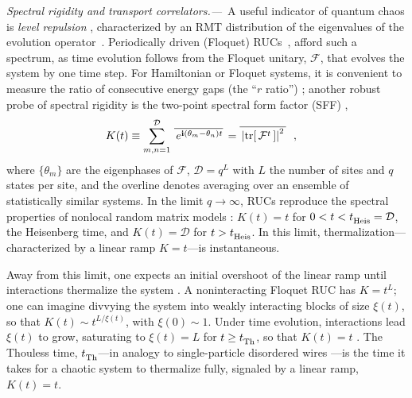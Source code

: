 \documentclass[prl,aps,amsfonts,twocolumn,superscriptaddress,notitlepage,floatfix]{revtex4-1}
\newcommand{\be}{\begin{eqnarray}}
\newcommand{\ee}{\end{eqnarray}}
\newcommand{\vpd}[0]{\vphantom{\dagger}}
\newcommand{\trace}{{\rm tr}}
\def\Floq{\mathcal{F}}
\def\tth{t^{\vpd}_{\rm Th}}
\def\theis{t^{\vpd}_{\rm Heis}}
\def\Hdim{\mathcal{D}}
\def\Ldim{q}
\begin{document}
\noindent \emph{Spectral rigidity and transport correlators.---}\, A useful indicator of quantum chaos is \emph{level repulsion} \cite{ETH1,ETH2,ShenkerRMT}, characterized by an RMT distribution of the eigenvalues of the evolution operator~\cite{ShenkerRMT,ShenkerRMT,ProsenRMTChaosPRX,SwingleSFFHydro,CDLC1,CDLC2,U1FRUC,Kos_2021}. Periodically driven (Floquet) RUCs~\cite{CDLC1,CDLC2,CiracRUFC,U1FRUC}, afford such a spectrum, as time evolution follows from the Floquet unitary, $\Floq$, that evolves the system by one time step. For Hamiltonian or Floquet systems, it is convenient to measure the ratio of consecutive energy gaps (the ``$r$ ratio'') \cite{rratio}; another robust probe of spectral rigidity is the two-point spectral form factor (SFF)  \cite{bertini2018exact,FyodorovMirlin,CDLC1,CDLC2,U1FRUC,ShenkerRMT,ShenkerRMT,SwingleSFFHydro,SwingleSFFSSB,Kos_2021}, 
\be \label{eq:Ktdef}
K(t) \equiv \sum\limits_{m,n = 1}^{\Hdim} \, \overline{\, e^{\mathbf{i} \left( \theta_m - \theta_n \right) t } }\, = \overline{\, \left| \trace [ \, \Floq^t \, ] \right|^2 \,}~~,~~~
\ee
where $\{\theta^{\,}_m\}$ are the eigenphases of $\Floq$, $\Hdim=\Ldim^L$ with $L$ the number of sites and $\Ldim$ states per site, and the overline denotes averaging over an ensemble of statistically similar systems. In the limit $\Ldim \to \infty$, RUCs reproduce the spectral properties of nonlocal random matrix models \cite{BnB,CDLC1}: $K(t) = t$ for $0 < t < \theis = \Hdim$, the Heisenberg time, and $K(t) = \Hdim$ for $t>\theis$. In this limit, thermalization---characterized by a linear ramp $K = t$---is instantaneous. 




Away from this limit, one expects an initial overshoot of the linear ramp until interactions thermalize the system \cite{CDLC2,SwingleSFFHydro}. A noninteracting Floquet RUC has $K = t^L$; one can imagine divvying the system into weakly interacting 
blocks of size $\xi (t)$, so that $K(t) \sim t^{L/\xi (t)}$, with $\xi (0) \sim 1$. Under time evolution, interactions lead $\xi (t)$ to grow, saturating to $\xi  (t) = L$ for $t \geq \tth$, so that $K(t) = t$ \cite{ShenkerRMT,CDLC1,ProsenRMTChaosPRX,bertini2018exact,U1FRUC}. The Thouless time, $\tth$---in analogy to single-particle disordered wires \cite{Thouless74,ThoulessThinWire}---is the time it takes for a chaotic system to thermalize fully, signaled by a linear ramp, $K(t) = t$. 
\end{document}
